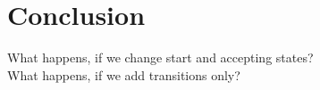 \chapter{Conclusion}

What happens, if we change start and accepting states? \\
What happens, if we add transitions only?
